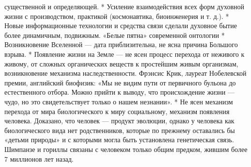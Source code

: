 \documentclass[12pt]{article}
\begin{document}
существенной и определяющей.
 * Усиление взаимодействия всех форм духовной жизни с производством, практикой (космонавтика,
биоинженерия и т. д.).
 * Новые информационные технологии и средства связи сделали духовное бытие более динамичным,
подвижным.
«Белые пятна» современной онтологии
* Возникновение Вселенной — дата приблизительна, не ясна причина Большого взрыва.
* Появление жизни на Земле — не ясен процесс перехода от неживого к живому, от сложных органических
веществ к простейшим живым организмам, возникновение механизма наследственности.
Фрэнсис Крик, лауреат Нобелевской премии, английский биофизик: «Мы не видим пути от первичного бульона
до естественного отбора. Можно прийти к выводу, что происхождение жизни — чудо, но это свидетельствует
только о нашем незнании».
 * Не ясен механизм перехода от мира биологического к миру социальному, механизм появления человека.
Доказано, что человек — продукт эволюции, однако у человека как биологического вида нет родственников,
которые по прежнему оставались бы «детьми природы» и с которыми могла быть установлена генетическая
связь. Шимпанзе и гориллы связаны с человеком только общим предком, жившим более 7 миллионов лет назад.


\newpage
\end{document}
